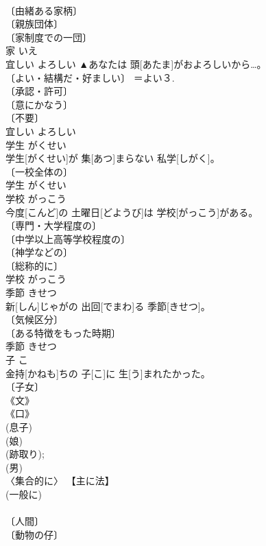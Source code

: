 \documentclass[8pt]{extreport}
\begin{document}
\begin{CJK}{UTF8}{min}
\\	〔由緒ある家柄〕 
\\	〔親族団体〕 
\\	〔家制度での一団〕 
\\	家	いえ	
\\	宜しい	よろしい	▲あなたは 頭[あたま]がおよろしいから…。	
\\	〔よい・結構だ・好ましい〕 ＝よい３. 
\\	〔承認・許可〕 
\\	〔意にかなう〕 
\\	〔不要〕 
\\	宜しい	よろしい	
\\	学生	がくせい	
\\	学生[がくせい]が 集[あつ]まらない 私学[しがく]。	
\\	〔一校全体の〕 
\\	学生	がくせい	
\\	学校	がっこう	
\\	今度[こんど]の 土曜日[どようび]は 学校[がっこう]がある。	
\\	〔専門・大学程度の〕 
\\	〔中学以上高等学校程度の〕 
\\	〔神学などの〕 
\\	〔総称的に〕 
\\	学校	がっこう	
\\	季節	きせつ	
\\	新[しん]じゃがの 出回[でまわ]る 季節[きせつ]。	
\\	〔気候区分〕 
\\	〔ある特徴をもった時期〕 
\\	季節	きせつ	
\\	子	こ	
\\	金持[かねも]ちの 子[こ]に 生[う]まれたかった。	
\\	〔子女〕 
\\	《文》 
\\	《口》 
\\	(息子) 
\\	(娘) 
\\	(跡取り); 
\\	(男) 
\\	〈集合的に〉 【主に法】 
\\	(一般に) 
\\	[＝こども 
\\	〔幼少者〕 
\\	[⇒こ７] 
\\	〔人間〕 
\\	〔動物の仔〕 

\end{CJK}
\end{document}
